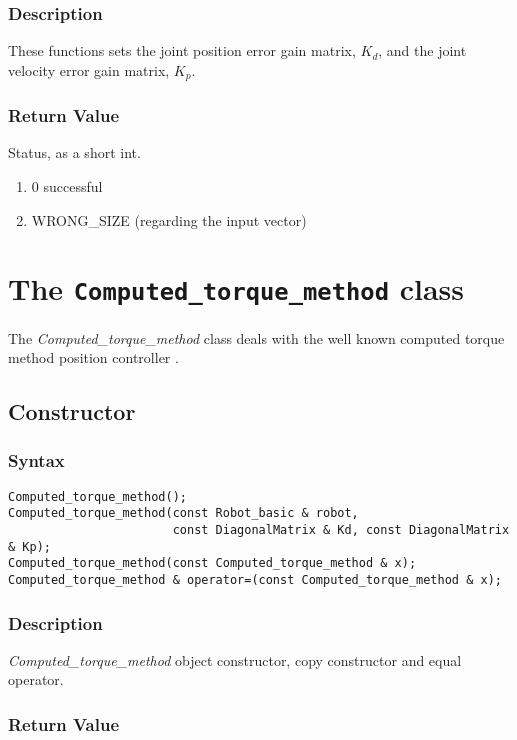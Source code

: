 \documentclass[dvips,11pt,fleqn]{report}
\begin{document}
\subsubsection*{Description}   
These functions sets the joint position error gain matrix, $K_d$, and
the joint velocity error gain matrix, $K_p$.
\subsubsection*{Return Value}

Status, as a short int.
\begin{enumerate}
\item[] 0 successful
\item[] WRONG\_SIZE (regarding the input vector)
\end{enumerate}

\newpage

\section{The \texttt{Computed\_torque\_method} class}

The \emph{Computed\_torque\_method} class deals with the well known
computed torque method position controller \cite{Fu87}.

\subsection*{Constructor}
\subsubsection*{Syntax}
\begin{verbatim}
Computed_torque_method();
Computed_torque_method(const Robot_basic & robot, 
                       const DiagonalMatrix & Kd, const DiagonalMatrix & Kp);
Computed_torque_method(const Computed_torque_method & x);
Computed_torque_method & operator=(const Computed_torque_method & x);
\end{verbatim}

\subsubsection*{Description}   
\emph{Computed\_torque\_method} object constructor, copy constructor
and equal operator.

\subsubsection*{Return Value}
\end{document}
